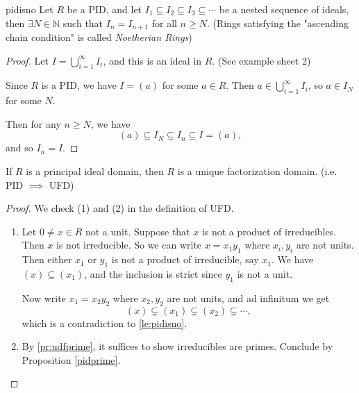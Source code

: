 \begin{lemma}{}{pidisno}
    Let \(R\) be a PID, and let \(I_1 \subseteq I_2 \subseteq I_3 \subseteq \cdots\) be a nested sequence of ideals, then \(\exists N \in \mathbb{N}\) such that \(I_n = I_{n+1}\) for all \(n \geq N\). (Rings satisfying the "ascending chain condition" is called \textit{Noetherian Rings})
\end{lemma}
\begin{proof}
    Let \(I = \bigcup_{i=1}^\infty I_i\), and this is an ideal in \(R\). (See example sheet 2)

    Since \(R\) is a PID, we have \(I = (a)\) for some \(a \in R\). Then \(a \in \bigcup_{i=1}^\infty I_i\), so \(a \in I_{N}\) for some \(N\).

    Then for any \(n \geq N\), we have
    \[
        (a) \subseteq I_N \subseteq I_n \subseteq I = (a),
    \]
    and so \(I_n = I\).
\end{proof}
\begin{theorem}{}{}
    If \(R\) is a principal ideal domain, then \(R\) is a unique factorization domain. (i.e. PID \(\implies\) UFD)
\end{theorem}
\begin{proof}
    We check (1) and (2) in the definition of UFD.
    \begin{enumerate}
        \item Let \(0 \neq x \in R\) not a unit. Suppose that \(x\) is not a product of irreducibles. Then \(x\) is not irreducible. So we can write \(x = x_{1}y_1\) where \(x_i, y_i\) are not units. Then either \(x_1\) or \(y_1\) is not a product of irreducible, say \(x_1\). We have \((x) \subseteq (x_1)\), and the inclusion is strict since \(y_1\) is not a unit.

        Now write \(x_1 = x_2 y_2\) where \(x_2, y_2\) are not units, and ad infinitum we get
        \[
            (x)\subsetneq (x_1) \subsetneq (x_2) \subsetneq \cdots,
        \]
        which is a contradiction to \cref{le:pidisno}.
        \item By \cref{pr:udfprime}, it suffices to show irreducibles are primes. Conclude by Proposition \eqref{pidprime}.
    \end{enumerate}
\end{proof}
